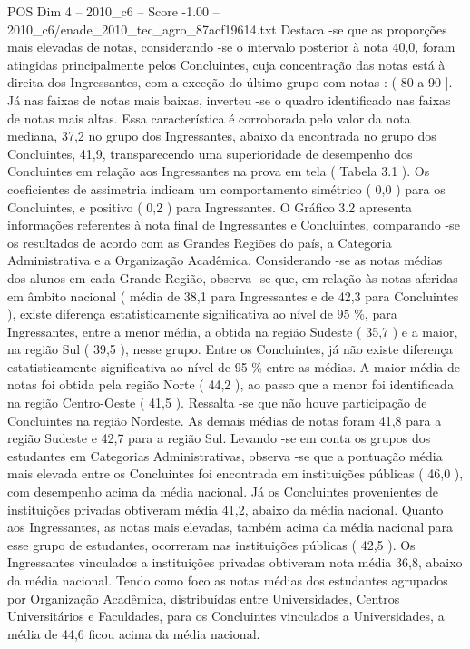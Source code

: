\begin{textsample}{POS Dim 4 – 2010\_c6 – Score -1.00 – 2010\_c6/enade\_2010\_tec\_agro\_87acf19614.txt}
Destaca -se que as proporções mais elevadas de notas, considerando -se o intervalo posterior à nota 40,0, foram atingidas principalmente pelos Concluintes, cuja concentração das notas está à direita dos Ingressantes, com a exceção do último grupo com notas : ( 80 a 90 ].
Já nas faixas de notas mais baixas, inverteu -se o quadro identificado nas faixas de notas mais altas.
Essa característica é corroborada pelo valor da nota mediana, 37,2 no grupo dos Ingressantes, abaixo da encontrada no grupo dos Concluintes, 41,9, transparecendo uma superioridade de desempenho dos Concluintes em relação aos Ingressantes na prova em tela ( Tabela 3.1 ).
Os coeficientes de assimetria indicam um comportamento simétrico ( 0,0 ) para os Concluintes, e positivo ( 0,2 ) para Ingressantes.
O Gráfico 3.2 apresenta informações referentes à nota final de Ingressantes e Concluintes, comparando -se os resultados de acordo com as Grandes Regiões do país, a Categoria Administrativa e a Organização Acadêmica.
Considerando -se as notas médias dos alunos em cada Grande Região, observa -se que, em relação às notas aferidas em âmbito nacional ( média de 38,1 para Ingressantes e de 42,3 para Concluintes ), existe diferença estatisticamente significativa ao nível de 95 \%, para Ingressantes, entre a menor média, a obtida na região Sudeste ( 35,7 ) e a maior, na região Sul ( 39,5 ), nesse grupo.
Entre os Concluintes, já não existe diferença estatisticamente significativa ao nível de 95 \% entre as médias.
A maior média de notas foi obtida pela região Norte ( 44,2 ), ao passo que a menor foi identificada na região Centro-Oeste ( 41,5 ).
Ressalta -se que não houve participação de Concluintes na região Nordeste.
As demais médias de notas foram 41,8 para a região Sudeste e 42,7 para a região Sul.
Levando -se em conta os grupos dos estudantes em Categorias Administrativas, observa -se que a pontuação média mais elevada entre os Concluintes foi encontrada em instituições públicas ( 46,0 ), com desempenho acima da média nacional.
Já os Concluintes provenientes de instituições privadas obtiveram média 41,2, abaixo da média nacional.
Quanto aos Ingressantes, as notas mais elevadas, também acima da média nacional para esse grupo de estudantes, ocorreram nas instituições públicas ( 42,5 ).
Os Ingressantes vinculados a instituições privadas obtiveram nota média 36,8, abaixo da média nacional.
Tendo como foco as notas médias dos estudantes agrupados por Organização Acadêmica, distribuídas entre Universidades, Centros Universitários e Faculdades, para os Concluintes vinculados a Universidades, a média de 44,6 ficou acima da média nacional.

\end{textsample}
